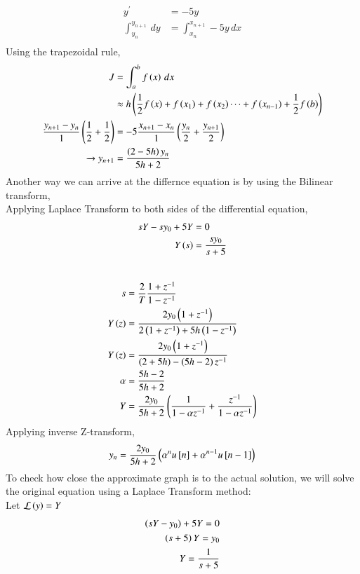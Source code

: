 \documentclass[journal]{IEEEtran}
\begin{document}
\begin{align}
    y^{\prime} &= -5y \\
    \int_{y_n}^{y_{n+1}} \, dy &= \int_{x_n}^{x_{n+1}} -5y \, dx\\
\end{align}
Using the trapezoidal rule,
\begin{align}
    J &= \int_a^b f\left(x\right)\, dx\\
    &\approx h\left(\frac{1}{2}f\left(x\right) + f\left(x_1\right) + f\left(x_2\right) \cdots + f\left(x_{n-1}\right) + \frac{1}{2}f\left(b\right)\right)\\
    \frac{y_{n+1} - y_n}{1}\left(\frac{1}{2} + \frac{1}{2}\right)
    &= -5\frac{x_{n+1} - x_{n}}{1}\left(\frac{y_n}{2} +\frac{y_{n+1}}{2}\right) \\ 
    \xrightarrow{} y_{n+1} &= \frac{\left(2-5h\right)y_n}{5h+2} 
\end{align}
Another way we can arrive at the differnce equation is by using the Bilinear transform,\\
Applying Laplace Transform to both sides of the differential equation,
\begin{align}
    sY - sy_0 + 5Y &= 0\\
    Y\left(s\right) &= \frac{sy_0}{s+5}\\
\end{align}
    \\
\begin{align}
    s &= \frac{2}{T} \frac{1+z^{-1}}{1-z^{-1}}\\
    Y\left(z\right) &= \frac{2y_0\left(1 + z^{-1}\right)}{2\left(1 + z^{-1}\right) + 5h\left(1 - z^{-1}\right)}\\
    Y\left(z\right) &= \frac{2y_0\left(1 + z^{-1}\right)}{\left(2+5h\right) - \left(5h-2\right)z^{-1}}\\
    \alpha &= \frac{5h-2}{5h+2}\\
    Y &= \frac{2y_0}{5h+2}\left(\frac{1}{1- \alpha z^{-1}} + \frac{z^{-1}}{1 - \alpha z^{-1}}\right)
\end{align}
Applying inverse Z-transform,
\begin{align}
    y_n &= \frac{2y_0}{5h+2} \left(\alpha ^n u{}\left[n\right] + \alpha^{n-1}u{}\left[n-1\right]\right)\\  
\end{align}
To check how close the approximate graph is to the actual solution, we will solve the original 
equation using a Laplace Transform method:\\
Let $\mathcal{L}\left(y\right) = Y$\\
\begin{align}
    \left(sY - y_0\right) +5Y = 0\\
    \left(s + 5\right)Y = y_0\\
    Y = \frac{1}{s + 5}\\
\end{align}
\end{document}
